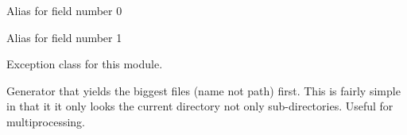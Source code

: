\documentclass[letterpaper,10pt,english]{sphinxmanual}
\begin{document}
\begin{fulllineitems}
\begin{fulllineitems}
\label{\detokenize{ref/util/DirWalk:TotalDepth.util.DirWalk.FileInOut.filePathIn}}
Alias for field number 0

\end{fulllineitems}


\begin{fulllineitems}
\label{\detokenize{ref/util/DirWalk:TotalDepth.util.DirWalk.FileInOut.filePathOut}}
Alias for field number 1

\end{fulllineitems}


\end{fulllineitems}


\begin{fulllineitems}
\label{\detokenize{ref/util/DirWalk:TotalDepth.util.DirWalk.ExceptionDirWalk}}
Exception class for this module.

\end{fulllineitems}


\begin{fulllineitems}
\label{\detokenize{ref/util/DirWalk:TotalDepth.util.DirWalk.genBigFirst}}
Generator that yields the biggest files (name not path) first.
This is fairly simple in that it it only looks the current directory not
only sub-directories. Useful for multiprocessing.

\end{fulllineitems}

\end{document}
